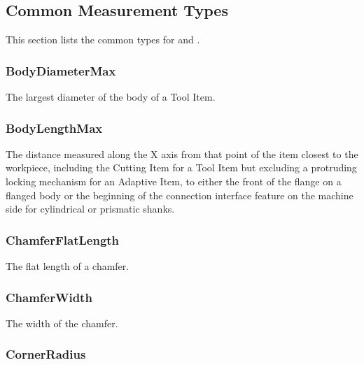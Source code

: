 \subsection{Common Measurement Types} \label{sec:Common Measurement Types}


This section lists the common  types for  and .


\subsubsection{BodyDiameterMax}
\label{sec:BodyDiameterMax}



The largest diameter of the body of a Tool Item.



\subsubsection{BodyLengthMax}
\label{sec:BodyLengthMax}



The distance measured along the X axis from that point of the item closest to the workpiece, including the Cutting Item for a Tool Item but excluding a protruding locking mechanism for an Adaptive Item, to either the front of the flange on a flanged body or the beginning of the connection interface feature on the machine side for cylindrical or prismatic shanks.



\subsubsection{ChamferFlatLength}
\label{sec:ChamferFlatLength}



The flat length of a chamfer.



\subsubsection{ChamferWidth}
\label{sec:ChamferWidth}



The width of the chamfer.



\subsubsection{CornerRadius}
\label{sec:CornerRadius}



